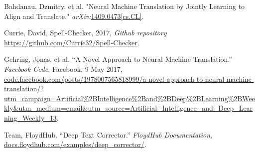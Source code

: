 \documentclass[11pt,a4paper]{scrartcl}
\theoremstyle{definition}
\begin{document}
\vspace{1em}

\begin{thebibliography}{7}
 Bahdanau, Dzmitry, et al. "Neural Machine Translation by Jointly Learning to Align and Translate." \emph{arXiv:}\url{1409.0473[cs.CL]}.

 Currie, David, Spell-Checker, 2017, \emph{Github repository} \url{https://github.com/Currie32/Spell-Checker}.

 Gehring, Jonas, et al. “A Novel Approach to Neural Machine Translation.” \emph{Facebook Code}, Facebook, 9 May 2017, \url{code.facebook.com/posts/1978007565818999/a-novel-approach-to-neural-machine-translation/?utm_campaign=Artificial%2BIntelligence%2Band%2BDeep%2BLearning%2BWeekly&utm_medium=email&utm_source=Artificial_Intelligence_and_Deep_Learning_Weekly_13}.

 Team, FloydHub. “Deep Text Corrector.” \emph{FloydHub Documentation}, \url{docs.floydhub.com/examples/deep_corrector/}.

\end{thebibliography}
\end{document}
